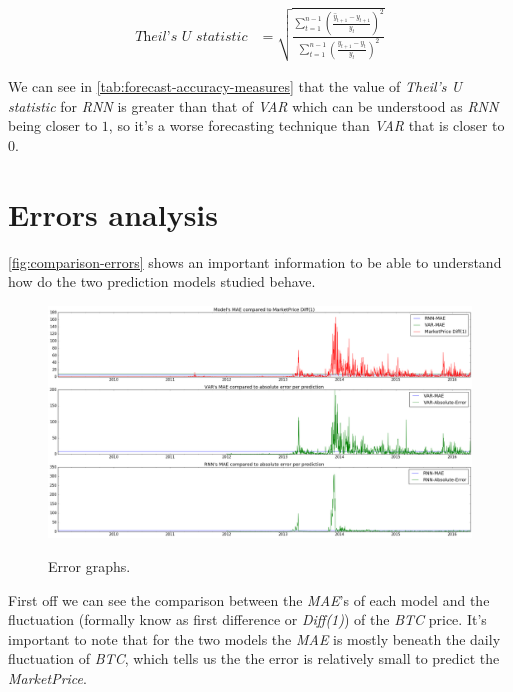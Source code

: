 \begin{equation}
  \begin{aligned}
    \label{eq:theils-u-statistic}
    \textit{Theil's U statistic} & = \sqrt{\frac {\displaystyle\sum_{t
          = 1}^{n - 1} \left( \frac{\hat{y}_{t+1} - y_{t+1}}{y_t}
        \right)^2} {\displaystyle\sum_{t = 1}^{n - 1} \left(
          \frac{y_{t+1} - y_t}{y_t} \right)^2}}
  \end{aligned}
\end{equation}

We can see in \autoref{tab:forecast-accuracy-measures} that the value
of \textit{Theil's U statistic} for \textit{RNN} is greater than that
of \textit{VAR} which can be understood as \textit{RNN} being closer
to $1$, so it's a worse forecasting technique than \textit{VAR} that
is closer to $0$.

\section{Errors analysis}
\label{sec:errors-analysis}

\autoref{fig:comparison-errors} shows an important information to be
able to understand how do the two prediction models studied behave.

\begin{figure}[bth]
  \myfloatalign
  {
    \includegraphics[width=1\linewidth]
    {gfx/comparison-errors}}
  \caption{Error graphs.}
  \label{fig:comparison-errors}
\end{figure}

First off we can see the comparison between the \textit{MAE}'s of each
model and the fluctuation (formally know as first difference or
\textit{Diff(1)}) of the \textit{BTC} price. It's important to note
that for the two models the \textit{MAE} is mostly beneath the daily
fluctuation of \textit{BTC}, which tells us the the error is
relatively small to predict the \textit{MarketPrice}.

